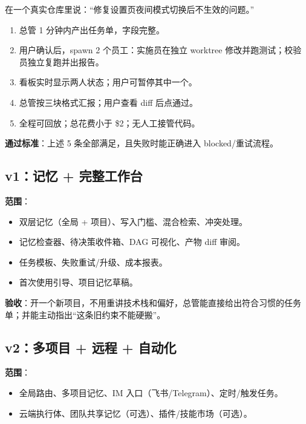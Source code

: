 \documentclass[UTF8,11pt,a4paper,fontset=windows]{ctexart}
\let\ocsubsection\subsection
\renewcommand{\subsection}{\Needspace{5\baselineskip}\ocsubsection}
\begin{document}
\begin{keybox}[v0 验收剧本]
在一个真实仓库里说：“修复设置页夜间模式切换后不生效的问题。”

\begin{enumerate}
  \item 总管 1 分钟内产出任务单，字段完整。
  \item 用户确认后，spawn 2 个员工：实施员在独立 worktree 修改并跑测试；校验员独立复跑并出报告。
  \item 看板实时显示两人状态；用户可暂停其中一个。
  \item 总管按三块格式汇报；用户查看 diff 后点通过。
  \item 全程可回放；总花费小于 \$2；无人工接管代码。
\end{enumerate}

\textbf{通过标准}：上述 5 条全部满足，且失败时能正确进入 blocked/重试流程。
\end{keybox}

\subsection{v1：记忆 + 完整工作台}

\textbf{范围}：

\begin{itemize}
  \item 双层记忆（全局 + 项目）、写入门槛、混合检索、冲突处理。
  \item 记忆检查器、待决策收件箱、DAG 可视化、产物 diff 审阅。
  \item 任务模板、失败重试/升级、成本报表。
  \item 首次使用引导、项目记忆草稿。
\end{itemize}

\textbf{验收}：开一个新项目，不用重讲技术栈和偏好，总管能直接给出符合习惯的任务单；并能主动指出“这条旧约束不能硬搬”。

\subsection{v2：多项目 + 远程 + 自动化}

\textbf{范围}：

\begin{itemize}
  \item 全局路由、多项目记忆、IM 入口（飞书/Telegram）、定时/触发任务。
  \item 云端执行体、团队共享记忆（可选）、插件/技能市场（可选）。
\end{itemize}
\end{document}
